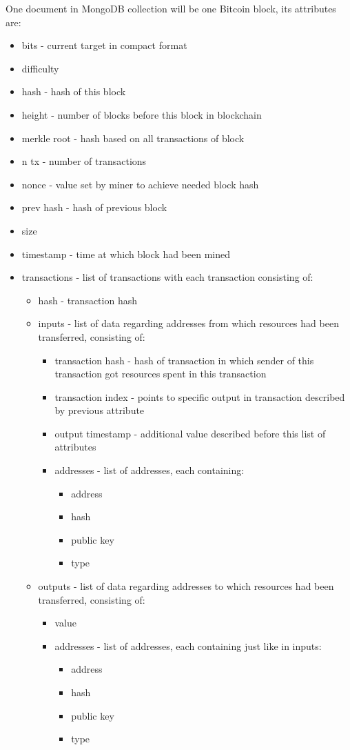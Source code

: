 \documentclass[12pt, en, eng, oneside, final]{mgr}
\begin{document}
One document in MongoDB collection will be one Bitcoin block, its attributes are:
\begin{itemize}
\item
bits - current target in compact format \cite{bitcoin-wiki-bha}
\item
difficulty
\item
hash - hash of this block
\item
height - number of blocks before this block in blockchain
\item
merkle root - hash based on all transactions of block
\item
n tx - number of transactions
\item
nonce - value set by miner to achieve needed block hash
\item
prev hash - hash of previous block
\item
size
\item
timestamp - time at which block had been mined
\item
transactions - list of transactions with each transaction consisting of:
\begin{itemize}
\item
hash - transaction hash
\item
inputs - list of data regarding addresses from which resources had been transferred, consisting of:
\begin{itemize}
\item
transaction hash - hash of transaction in which sender of this transaction got resources spent in this transaction
\item
transaction index - points to specific output in transaction described by previous attribute
\item
output timestamp - additional value described before this list of attributes
\item addresses - list of addresses, each containing:
\begin{itemize}
\item
address
\item
hash
\item
public key
\item
type
\end{itemize}
\end{itemize}	
\item
outputs - list of data regarding addresses to which resources had been transferred, consisting of:	
\begin{itemize}
\item
value
\item addresses - list of addresses, each containing just like in inputs:
\begin{itemize}
\item
address
\item
hash
\item
public key
\item
type
\end{itemize}
\end{itemize} 	
\end{itemize}
\end{itemize}
\end{document}
